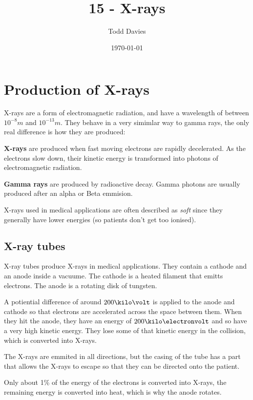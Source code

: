 \documentclass{article}
\title{15 - X-rays}
\author{Todd Davies}
\date{\today}
\begin{document}
\lhead{\today}

\maketitle

\section{Production of X-rays}
\thispagestyle{empty}

X-rays are a form of electromagnetic radiation, and have a wavelength of between
$10^{-8}m$ and $10^{-13}m$. They behave in a very simimlar way to gamma rays,
the only real difference is how they are produced:

{\bf X-rays} are produced when fast moving electrons are rapidly
decelerated. As the electrons slow down, their kinetic energy is transformed
into photons of electromagnetic radiation.

{\bf Gamma rays} are produced by radioactive decay. Gamma photons are
usually produced after an alpha or Beta emmision.

X-rays used in medical applications are often described as {\it soft} since they
generally have lower energies (so patients don't get too ionised).

\subsection{X-ray tubes}

X-ray tubes produce X-rays in medical applications. They contain a cathode and
an anode inside a vacuume. The cathode is a heated filament that emitts
electrons. The anode is a rotating disk of tungsten.

A potiential difference of around $200\kilo\volt$ is applied to the
anode and cathode so that electrons are accelerated across the space between
them. When they hit the anode, they have an energy of $200\kilo\electronvolt$
and so have a very high kinetic energy. They lose some of that kinetic energy in
the collision, which is converted into X-rays.

The X-rays are emmited in all directions, but the casing of the tube has a part
that allows the X-rays to escape so that they can be directed onto the patient.

Only about 1\% of the energy of the electrons is converted into X-rays, the
remaining energy is converted into heat, which is why the anode rotates.
\end{document}
